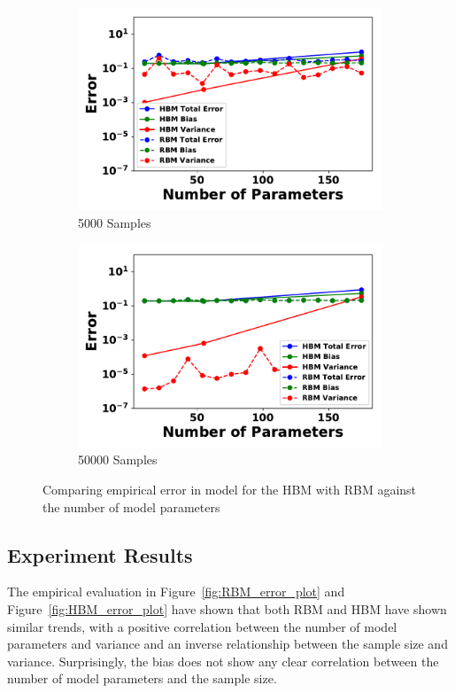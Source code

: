 \documentclass[letterpaper]{article} %
\begin{document}
\begin{figure}[ht]
\begin{subfigure}[b]{0.495\textwidth}
              \includegraphics[width=\textwidth]{./HBM_vs_RBM_Error_vs_NParameters_Samples5000-eps-converted-to.pdf}
              \caption{5000 Samples}
          \end{subfigure}
          \begin{subfigure}[b]{0.495\textwidth}
              \centering
              \includegraphics[width=\textwidth]{./HBM_vs_RBM_Error_vs_NParameters_Samples50000-eps-converted-to.pdf}
              \caption{50000 Samples}
          \end{subfigure}
          \caption{Comparing empirical error in model for the HBM with RBM against the number of model parameters} \label{fig:RBM_vs_HBM}
        \end{figure}

	\subsection{Experiment Results}
		The empirical evaluation in Figure~\ref{fig:RBM_error_plot} and Figure~\ref{fig:HBM_error_plot} have shown that both RBM and HBM have shown similar trends, with a positive correlation between the number of model parameters and variance and an inverse relationship between the sample size and variance. Surprisingly, the bias does not show any clear correlation between the number of model parameters and the sample size.
\end{document}
